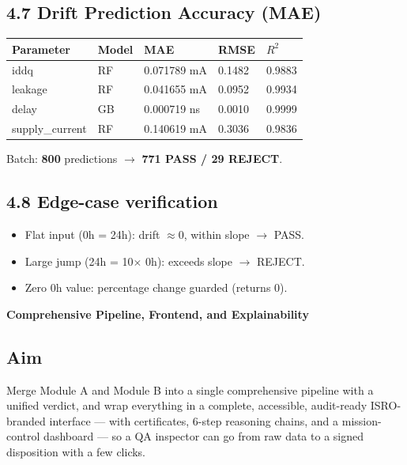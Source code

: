 \documentclass[11pt,a4paper]{article}
\newcommand{\phasebox}[3]{\par\vspace{1em}\noindent
  \begin{tcolorbox}[colback=isroblue!6,colframe=isroblue,
    title={\sffamily\bfseries\color{white}#1 \quad [Progress: #2]},arc=2pt,boxrule=1.2pt]
    \textbf{#3}
  \end{tcolorbox}\par\vspace{0.4em}}
\begin{document}
\subsection*{4.7 Drift Prediction Accuracy (MAE)}
\begin{center}
\begin{tabular}{@{}lllll@{}}
\toprule
\textbf{Parameter} & \textbf{Model} & \textbf{MAE} & \textbf{RMSE} & $R^2$\\
\midrule
iddq & RF & 0.071789 mA & 0.1482 & 0.9883\\
leakage & RF & 0.041655 mA & 0.0952 & 0.9934\\
delay & GB & 0.000719 ns & 0.0010 & 0.9999\\
supply\_current & RF & 0.140619 mA & 0.3036 & 0.9836\\
\bottomrule
\end{tabular}
\end{center}
Batch: \textbf{800} predictions $\rightarrow$ \textbf{771 PASS / 29 REJECT}.

\subsection*{4.8 Edge-case verification}
\begin{itemize}[leftmargin=1.5em]
  \item Flat input (0h = 24h): drift $\approx 0$, within slope $\rightarrow$ PASS.
  \item Large jump (24h = 10$\times$ 0h): exceeds slope $\rightarrow$ REJECT.
  \item Zero 0h value: percentage change guarded (returns 0).
\end{itemize}

\phasebox{Phase 5}{80\% -- 90\%}{Comprehensive Pipeline, Frontend, and Explainability}

\subsection*{Aim}
Merge Module A and Module B into a single comprehensive pipeline with a unified verdict, and wrap
everything in a complete, accessible, audit-ready ISRO-branded interface --- with certificates,
6-step reasoning chains, and a mission-control dashboard --- so a QA inspector can go from raw
data to a signed disposition with a few clicks.
\end{document}
